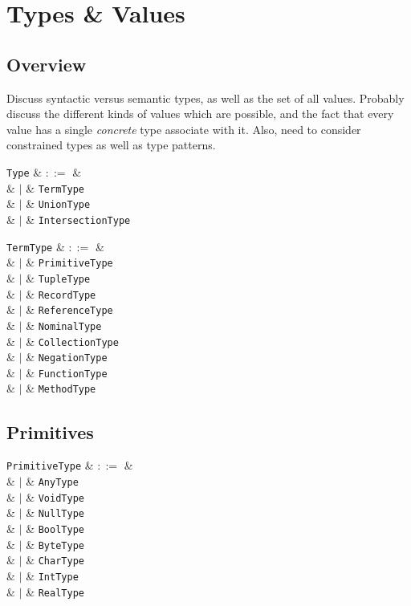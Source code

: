 \chapter{Types \& Values}
\section{Overview}
Discuss syntactic versus semantic types, as well as the set of all values.  Probably discuss the different kinds of values which are possible, and the fact that every value has a single {\em concrete} type associate with it.  Also, need to consider constrained types as well as type patterns.

\begin{syntax}
  \verb+Type+ & $::=$ & \\
  & $|$ & \verb+TermType+ \\
  & $|$ & \verb+UnionType+ \\
  & $|$ & \verb+IntersectionType+ \\
\end{syntax}

\begin{syntax}
  \verb+TermType+ & $::=$ & \\
  & $|$ & \verb+PrimitiveType+ \\
  & $|$ & \verb+TupleType+ \\
  & $|$ & \verb+RecordType+ \\
  & $|$ & \verb+ReferenceType+ \\
  & $|$ & \verb+NominalType+ \\
  & $|$ & \verb+CollectionType+ \\
  & $|$ & \verb+NegationType+ \\
  & $|$ & \verb+FunctionType+ \\
  & $|$ & \verb+MethodType+ \\
\end{syntax}


\section{Primitives}

\begin{syntax}
  \verb+PrimitiveType+ & $::=$ & \\
  & $|$ & \verb+AnyType+ \\
  & $|$ & \verb+VoidType+ \\
  & $|$ & \verb+NullType+ \\
  & $|$ & \verb+BoolType+ \\
  & $|$ & \verb+ByteType+ \\
  & $|$ & \verb+CharType+ \\
  & $|$ & \verb+IntType+ \\
  & $|$ & \verb+RealType+ \\
\end{syntax}


